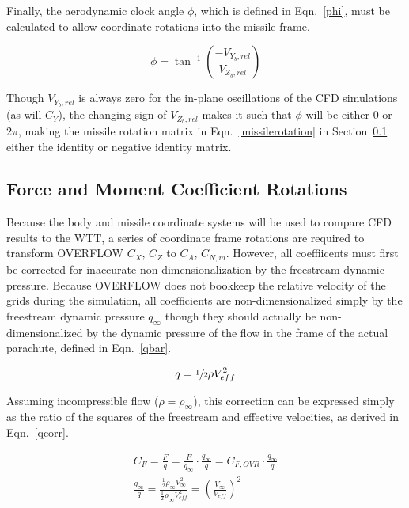 \documentclass[]{aiaa-tc}%
\begin{document}
Finally, the aerodynamic clock angle $\phi$, which is defined in Eqn.~\ref{phi}, must be calculated to allow coordinate rotations into the missile frame.

\begin{equation} \label{phi}
\phi=\tan^{-1}(\frac{-V_{Y_b,rel}}{V_{Z_b,rel}})
\end{equation}

\noindent Though $V_{Y_b,rel}$ is always zero for the in-plane oscillations of the CFD simulations (as will $C_Y$), the changing sign of $V_{Z_b,rel}$ makes it such that $\phi$ will be either $0$ or $2\pi$, making the missile rotation matrix in Eqn.~\ref{missilerotation} in Section~\ref{rotations} either the identity or negative identity matrix.

\subsection{Force and Moment Coefficient Rotations} \label{rotations}

Because the body and missile coordinate systems will be used to compare CFD results to the WTT, a series of coordinate frame rotations are required to transform OVERFLOW $C_X,\,C_Z$ to $C_A,\,C_{N,m}$.  However, all coeffiicents must first be corrected for inaccurate non-dimensionalization by the freestream dynamic pressure.  Because OVERFLOW does not bookkeep the relative velocity of the grids during the simulation, all coefficients are non-dimensionalized simply by the freestream dynamic pressure $q_{\infty}$ though they should actually be non-dimensionalized by the dynamic pressure of the flow in the frame of the actual parachute, defined in Eqn.~\ref{qbar}.

\begin{equation} \label{qbar}
  q=\sfrac{1}{2}\rho V_{eff}^2
\end{equation}

\noindent Assuming incompressible flow ($\rho = \rho_{\infty}$), this correction can be expressed simply as the ratio of the squares of the freestream and effective velocities, as derived in Eqn.~\ref{qcorr}.

\begin{equation} \label{qcorr}
\begin{gathered}
  C_F = \frac{F}{q} = \frac{F}{q_{\infty}} \cdot \frac{q_{\infty}}{q}
      = C_{F,OVR} \cdot \frac{q_{\infty}}{q} \\
  \frac{q_{\infty}}{q} = \frac{\frac{1}{2}\rho_{\infty} V_{\infty}^2}
                              {\frac{1}{2}\rho_{\infty} V_{eff}^2}
                =\left(\frac{V_{\infty}}{V_{eff}}\right)^2
\end{gathered}
\end{equation}
\end{document}
